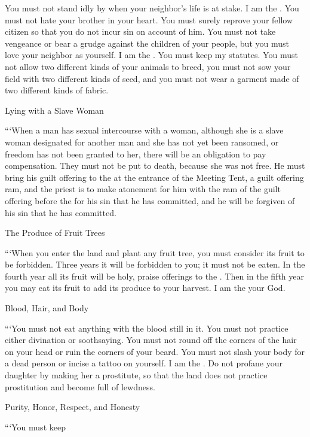 {You must not
stand
idly
by when your neighbor’s
life is at stake. I am
the {}.
You must not
hate
your brother
in your heart.
You must surely reprove
your fellow citizen
so that you do not
incur
sin
on account of him.
You must not
take vengeance
or
bear a grudge
against the children
of your people,
but you must love
your neighbor
as yourself.
I am
the {}.
You must keep
my statutes.
You must not
allow two different kinds
of your animals
to breed,
you must not
sow
your field
with two different kinds
of seed,
and you must not
wear
a garment
made of two different kinds
of fabric.
\par }{\SH Lying with a Slave Woman
\par }{\PP {}“‘When a man
has sexual intercourse
with
a woman,
although she is a slave woman
designated for another man
and she has not
yet been ransomed,
or
freedom
has not
been granted
to her, there will be an obligation to pay compensation.
They must not
be put to death,
because
she was not
free.
He must bring
his guilt offering
to the
{}
at the entrance
of the Meeting
Tent,
a guilt offering
ram,
and the priest
is to make atonement
for him
with the ram
of the guilt offering
before
the {}
for his sin
that
he has committed,
and he will be forgiven
of his sin
that
he has committed.
\par }{\SH The Produce of Fruit Trees
\par }{\PP {}“‘When
you enter
the land
and plant
any
fruit
tree,
you must consider its fruit
to be forbidden.
Three
years
it will be
forbidden
to you; it must not
be eaten.
In the fourth
year
all
its fruit
will be
holy,
praise
offerings to the
{}.
Then in the fifth
year
you may eat
its fruit
to add
its produce
to your harvest. I am
the {}
your God.
\par }{\SH Blood, Hair, and Body
\par }{\PP {}“‘You must not
eat
anything with the blood
still
in it. You must not
practice
either divination
or
soothsaying.
You must not
round
off the corners
of the hair on
your head
or
ruin
the corners
of your beard.
You must not
slash
your body
for a dead person
or incise
a tattoo
on yourself. I am
the {}.
Do not
profane
your daughter
by making her a prostitute,
so that the land
does not
practice prostitution
and become full
of lewdness.
\par }{\SH Purity, Honor, Respect, and Honesty
\par }{\PP {}“‘You must keep
}
